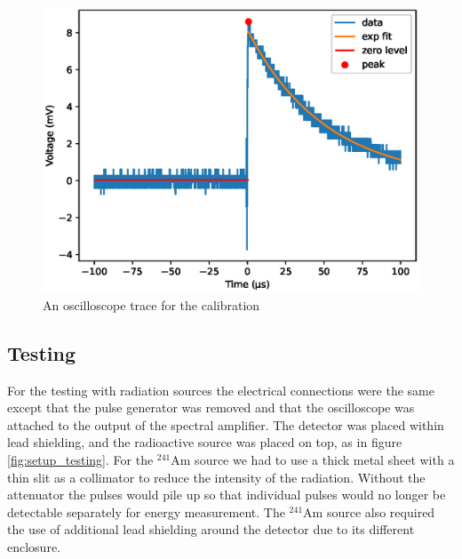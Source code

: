 \documentclass[a4paper]{article}
\begin{document}
\begin{figure}[ht!]
\centering
\includegraphics[width=\textwidth]{fig/python/calibration_trace.eps}
\caption{An oscilloscope trace for the calibration}
\label{fig:cal_trace}
\end{figure}



\FloatBarrier
\subsection{Testing}
\label{setup_testing}
For the testing with radiation sources the electrical connections were the same except that the pulse generator was removed and that the oscilloscope was attached to the output of the spectral amplifier.
The detector was placed within lead shielding, and the radioactive source was placed on top, as in figure \ref{fig:setup_testing}.
For the $^{241}$Am source we had to use a thick metal sheet with a thin slit as a collimator to reduce the intensity of the radiation.
Without the attenuator the pulses would pile up so that individual pulses would no longer be detectable separately for energy measurement.
The $^{241}$Am source also required the use of additional lead shielding around the detector due to its different enclosure.
\end{document}
